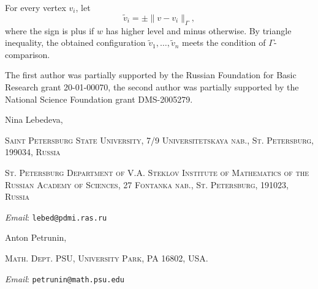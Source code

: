 \documentclass{article}
\makeatletter
\newcommand{\Addresses}{{\bigskip\footnotesize

\noindent Nina Lebedeva,
\par\nopagebreak
 \textsc{Saint Petersburg State University, 7/9 Universitetskaya nab., St. Petersburg, 199034, Russia}
\par
\nopagebreak
 \textsc{St. Petersburg Department of V.A. Steklov Institute of Mathematics of the Russian Academy of Sciences, 27 Fontanka nab., St. Petersburg, 191023, Russia}
  \par\nopagebreak
  \textit{Email}: \texttt{lebed@pdmi.ras.ru}

\medskip

\noindent   Anton Petrunin, 
\par\nopagebreak
 \textsc{Math. Dept. PSU, University Park, PA 16802, USA.}
  \par\nopagebreak
  \textit{Email}: \texttt{petrunin@math.psu.edu}
  
}}
\makeatother
\begin{document}
For every vertex $v_i$, let
\[\tilde v_i=\pm \|v-v_i\|_\Gamma,\]
where the sign is plus if $w$ has higher level and minus otherwise.
By triangle inequality, the obtained configuration $\tilde v_1,\dots,\tilde v_n$ meets the condition of $\Gamma$-comparison.
\qeds




The first author was partially supported by the Russian Foundation for Basic Research grant 20-01-00070, the second author was partially supported by the National Science Foundation grant DMS-2005279.

{\sloppy
\printbibliography[heading=bibintoc]
\fussy
}

\Addresses
\end{document}
